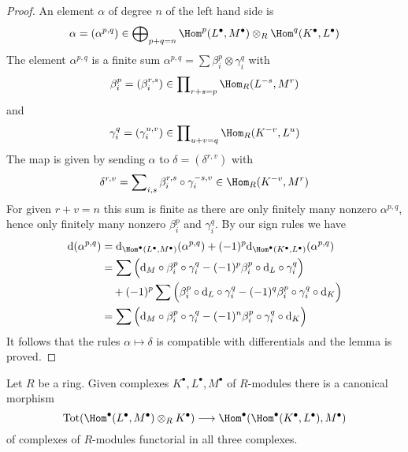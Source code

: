 \begin{proof}
An element $\alpha$ of degree $n$ of the left hand side is
$$
\alpha = (\alpha^{p, q}) \in \bigoplus\nolimits_{p + q = n}
\Hom^p(L^\bullet, M^\bullet) \otimes_R \Hom^q(K^\bullet, L^\bullet)
$$
The element $\alpha^{p, q}$ is a finite sum
$\alpha^{p, q} = \sum \beta^p_i \otimes \gamma^q_i$
with
$$
\beta^p_i = (\beta^{r, s}_i)
\in \prod\nolimits_{r + s = p} \Hom_R(L^{-s}, M^r)
$$
and
$$
\gamma^q_i = (\gamma^{u, v}_i)
\in \prod\nolimits_{u + v = q} \Hom_R(K^{-v}, L^u)
$$
The map is given by sending $\alpha$ to
$\delta = (\delta^{r, v})$ with
$$
\delta^{r, v} =
\sum\nolimits_{i, s}  \beta^{r, s}_i
\circ \gamma^{-s, v}_i
\in \Hom_R(K^{-v}, M^r)
$$
For given $r + v = n$ this sum is finite as there are only finitely many
nonzero $\alpha^{p, q}$, hence only finitely many nonzero
$\beta^p_i$ and $\gamma^q_i$.
By our sign rules we have
\begin{align*}
\text{d}(\alpha^{p, q})
& =
\text{d}_{\Hom^\bullet(L^\bullet, M^\bullet)}(\alpha^{p, q})
+ (-1)^p \text{d}_{\Hom^\bullet(K^\bullet, L^\bullet)}(\alpha^{p, q}) \\
& =
\sum \Big( \text{d}_M \circ \beta^p_i \circ \gamma^q_i
- (-1)^p \beta^p_i \circ \text{d}_L \circ \gamma^q_i \Big) \\
&
\quad + (-1)^p \sum \Big( \beta^p_i \circ \text{d}_L \circ \gamma^q_i
- (-1)^q \beta^p_i \circ \gamma^q_i \circ \text{d}_K \Big) \\
& =
\sum \Big( \text{d}_M \circ \beta^p_i \circ \gamma^q_i 
-(-1)^n \beta^p_i \circ \gamma^q_i \circ \text{d}_K \Big)
\end{align*}
It follows that the rules $\alpha \mapsto \delta$ is compatible
with differentials and the lemma is proved.
\end{proof}

\begin{lemma}
\label{lemma-evaluate-and-more}
Let $R$ be a ring. Given complexes $K^\bullet, L^\bullet, M^\bullet$
of $R$-modules there is a canonical morphism
$$
\text{Tot}(\Hom^\bullet(L^\bullet, M^\bullet) \otimes_R K^\bullet)
\longrightarrow
\Hom^\bullet(\Hom^\bullet(K^\bullet, L^\bullet), M^\bullet)
$$
of complexes of $R$-modules functorial in all three complexes.
\end{lemma}

